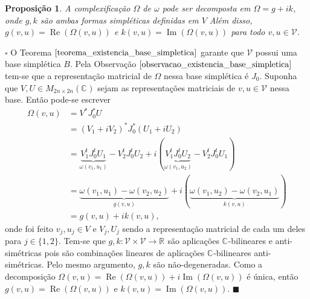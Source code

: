 \documentclass[12pt]{book}
\newtheorem{proposicao}[teorema]{Proposição}
\newenvironment{prova}[1]{$\square$ #1}{\hfill$\blacksquare$}
\DeclareMathOperator{\Ima}{Im}
\DeclareMathOperator{\re}{Re}
\newcommand{\complexificado}[1]{\mathcal{#1}}
\newcommand{\complexo}[1]{\mathbb{C}^{#1}}
\newcommand{\estruturacomplexa}{J_{0}}
\newcommand{\formaSimpletica}[2]{\omega(#1, #2)}
\newcommand{\formaSimpleticaExtendida}[2]{\Omega(#1, #2)}
\newcommand{\matrizquadcomplexa}[1]{M_{#1 \times #1}(\complexo{})}
\newcommand{\parteImaginaria}[1]{\Ima{(#1)}}
\newcommand{\parteReal}[1]{\re (#1)}
\newcommand{\real}[1]{\mathbb{R}^{#1}}
\newcommand{\reta}{\real{}}
\begin{document}
	\begin{proposicao}\label{proposicao_decomposicao_Omega}
		A complexificação $\Omega$ de $\omega$ pode ser decomposta em $\Omega = g +i k$, onde $g,k$ são ambas formas simpléticas definidas em $V$ Além disso, $g(v,u) = \parteReal{\Omega(v,u)}$ e $k(v,u) = \parteImaginaria{\Omega(v,u)}$ para todo $v,u \in \complexificado{V}$.
	\end{proposicao}
	\begin{prova} O Teorema $\ref{teorema_existencia_base_simpletica}$ garante que $\complexificado{V}$ possui uma base simplética $B$. Pela Observação $\ref{observacao_existencia_base_simpletica}$ tem-se que a representação matricial de $\Omega$ nessa base simplética é $\estruturacomplexa$. Suponha que $V, U \in \matrizquadcomplexa{2n}$ sejam as representações matriciais de $v,u \in \complexificado{V}$ nessa base. Então pode-se escrever 
	$$
		\begin{aligned}
		\formaSimpleticaExtendida{v}{u} &= V^{*}\estruturacomplexa^{*} U 
		\\
		&= (V_{1}+iV_{2})^{*}\estruturacomplexa^{*} (U_{1}+iU_{2})
		\\
		&= \underbrace{V_{1}^{t}\estruturacomplexa^{t} U_{1}}_{\formaSimpletica{v_{1}}{u_{1}}} -V_{2}^{t}\estruturacomplexa^{t} U_{2}+i(\underbrace{ V_{1}^{t}\estruturacomplexa^{t} U_{2}}_{\formaSimpletica{v_{1}}{u_{2}}} - V_{2}^{t}\estruturacomplexa^{t} U_{1})
		\\
		&= \underbrace{\formaSimpletica{v_{1}}{u_{1}} -\formaSimpletica{v_{2}}{u_{2}}}_{g(v,u)}+i(\underbrace{ \formaSimpletica{v_{1}}{u_{2}}- \formaSimpletica{v_{2}}{u_{1}}}_{k(v,u)})
		\\
		&= g(v,u)+ik(v,u),
		\end{aligned}
		$$
		onde foi feito  $v_{j}, u_{j}\in V$ e $V_{j}, U_{j}$ sendo a representação matricial de cada um deles para $j \in \{1,2\}$.
		Tem-se que $g,k:\complexificado{V}\times \complexificado{V} \to \reta$ são aplicações $\complexo{}$-bilineares e anti-simétricas pois são combinações lineares de aplicações $\complexo{}$-bilineares anti-simétricas. Pelo mesmo argumento, $g,k$ são não-degeneradas. Como a decomposição $\Omega(v,u) = \parteReal{\Omega(v,u)}+i\parteImaginaria{\Omega(v,u)}$ é única, então $g(v,u) = \parteReal{\Omega(v,u)}$ e $k(v,u) = \parteImaginaria{\Omega(v,u)}$.
	\end{prova}
	
\end{document}
